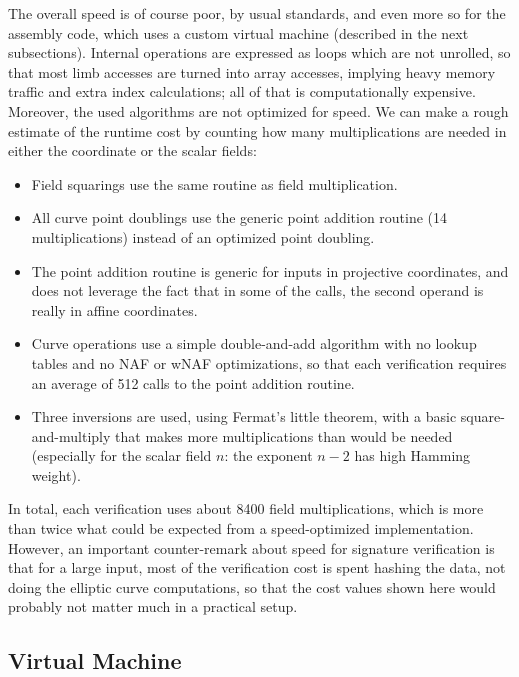 \documentclass{llncs}
\begin{document}
The overall speed is of course poor, by usual standards, and even more
so for the assembly code, which uses a custom virtual machine (described
in the next subsections). Internal operations are expressed as loops
which are not unrolled, so that most limb accesses are turned into array
accesses, implying heavy memory traffic and extra index calculations;
all of that is computationally expensive. Moreover, the used algorithms
are not optimized for speed. We can make a rough estimate of the runtime
cost by counting how many multiplications are needed in either the
coordinate or the scalar fields:
\begin{itemize}

    \item Field squarings use the same routine as field multiplication.

    \item All curve point doublings use the generic point addition
    routine (14 multiplications) instead of an optimized point doubling.

    \item The point addition routine is generic for inputs in projective
    coordinates, and does not leverage the fact that in some of the
    calls, the second operand is really in affine coordinates.

    \item Curve operations use a simple double-and-add algorithm with
    no lookup tables and no NAF or wNAF optimizations, so that each
    verification requires an average of 512 calls to the point addition
    routine.

    \item Three inversions are used, using Fermat's little theorem,
    with a basic square-and-multiply that makes more multiplications than
    would be needed (especially for the scalar field $n$: the exponent
    $n-2$ has high Hamming weight).

\end{itemize}
In total, each verification uses about 8400 field multiplications, which
is more than twice what could be expected from a speed-optimized
implementation. However, an important counter-remark about speed for
signature verification is that for a large input, most of the verification
cost is spent hashing the data, not doing the elliptic curve computations,
so that the cost values shown here would probably not matter much in a
practical setup.

\subsection{Virtual Machine}
\end{document}
